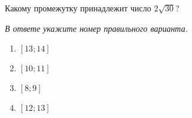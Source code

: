  
\begin{ex}
	Какому промежутку принадлежит число $2\sqrt{30}$?
	
	\textit{В ответе укажите номер правильного варианта.}
	\begin{multicols}{4}
		\begin{enumerate}[label=\arabic*)]
			\item $[13;14]$
			\item $[10;11]$
			\item $[8;9]$
			\item $[12;13]$
		\end{enumerate}
	\end{multicols}
\end{ex}